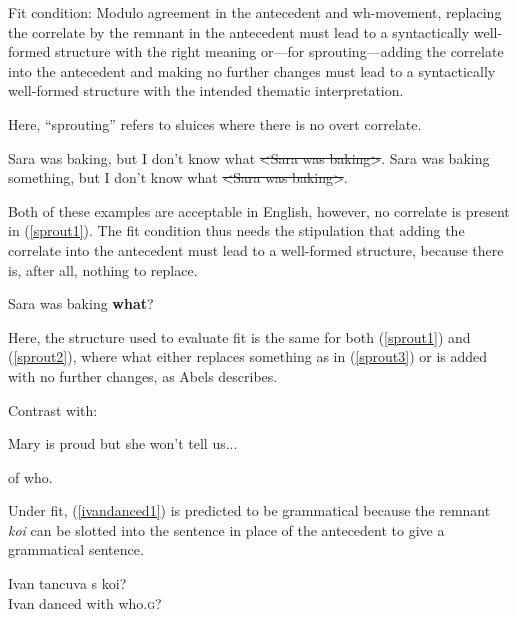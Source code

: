 \documentclass{turabian-researchpaper}
\begin{document}
\begin{exe}
\ex\label{fitcond} Fit condition: Modulo agreement in the antecedent and wh-movement, replacing the correlate by the remnant in the antecedent must lead to a syntactically well-formed structure with the right meaning or---for sprouting---adding the correlate into the antecedent and making no further changes must lead to a syntactically well-formed structure with the intended thematic interpretation. 
\end{exe}

Here, ``sprouting'' refers to sluices where there is no overt correlate. 

\begin{exe}
\ex
\begin{xlist}
\ex\label{sprout1} Sara was baking, but I don't know what \sout{\textless Sara was baking\textgreater}.
\ex\label{sprout2} Sara was baking something, but I don't know what \sout{\textless Sara was baking\textgreater}.
\end{xlist}
\end{exe} 

Both of these examples are acceptable in English, however, no correlate is present in (\ref{sprout1}). The fit condition thus needs the stipulation that adding the correlate into the antecedent must lead to a well-formed structure, because there is, after all, nothing to replace. 

\begin{exe}
\ex\label{sprout3} Sara was baking \textbf{what}? 
\end{exe}

Here, the structure used to evaluate fit is the same for both (\ref{sprout1}) and (\ref{sprout2}), where what either replaces something as in (\ref{sprout3}) or is added with no further changes, as Abels describes. 

Contrast with:
\begin{exe}
\ex\label{maryisproud} Mary is proud but she won't tell us...
\begin{xlist}
\ex of who.
\end{xlist}
\end{exe}

Under fit, (\ref{ivandanced1}) is predicted to be grammatical because the remnant \textit{koi} can be slotted into the sentence in place of the antecedent to give a grammatical sentence. 

\begin{exe}
\ex\label{ivandanced6}
\gll Ivan tancuva s      koi? \\ 
 Ivan danced   with who.\textsc{g}? \\
 \end{exe}
 
\end{document}
